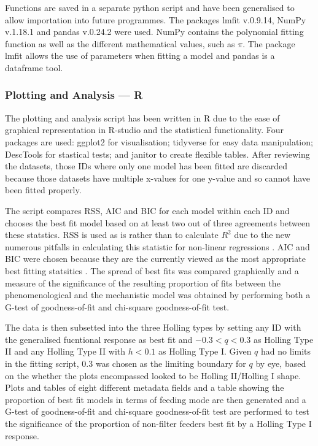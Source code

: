 \documentclass[11pt, a4paper, titlepage]{article}
\begin{document}
Functions are saved in a separate python script and have been generalised to allow importation into future programmes. The packages lmfit \parencite{lmfit} v.0.9.14, NumPy \parencite{NumPy} v.1.18.1 and pandas \parencite{pandas} v.0.24.2 were used. NumPy contains the polynomial fitting function as well as the different mathematical values, such as $\pi$. The package lmfit allows the use of parameters when fitting a model and pandas is a dataframe tool.

\subsubsection{Plotting and Analysis — R}
The plotting and analysis script has been written in R due to the ease of graphical representation in R-studio and the statistical functionality. Four packages are used: ggplot2 \parencite{ggplot2} for visualisation; tidyverse \parencite{tidyverse} for easy data manipulation; DescTools {\parencite{DescTools}}  for stastical tests; and janitor \parencite{janitor} to create flexible tables. After reviewing the datasets, those IDs where only one model has been fitted are discarded because those datasets have multiple x-values for one y-value and so cannot have been fitted properly.

The script compares RSS, AIC and BIC for each model within each ID and chooses the best fit model based on at least two out of three agreements between these statstics. RSS is used as is rather than to calculate $R^{2}$ due to the new numerous pitfalls in calculating this statistic for non-linear regressions \parencite{kvalseth1985}.
AIC and BIC were chosen because they are the currently viewed as the most appropriate best fitting statsitics \parencite{Johnson2004}. The spread of best fits was compared graphically and
a measure of the significance of the resulting proportion of fits between the phenomenological and the mechanistic model was obtained by performing both a G-test of goodness-of-fit and chi-square goodness-of-fit test. 

The data is then subsetted into the three Holling types by setting any ID with the generalised fucntional response as best fit and $-0.3<q<0.3$ as Holling Type II and any Holling Type II with $h<0.1$ as Holling Type I. Given $q$ had no limits in the fitting script, $0.3$ was chosen as the limiting boundary for $q$ by eye, based on the whether the plots encompassed looked to be Holling II/Holling I shape.
Plots and tables of eight different metadata fields and a table showing the proportion of best fit models in terms of feeding mode are then generated and a G-test of goodness-of-fit and chi-square goodness-of-fit test are performed to test the significance of the proportion of non-filter feeders best fit by a Holling Type I response.
\end{document}
